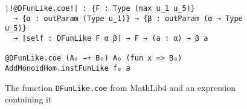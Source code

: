 \begin{figure}
  \begin{CenteredBox}
    \begin{lstlisting}[style=leanHH]
|!@DFunLike.coe!| : {F : Type (max u_1 u_5)}
  → {α : outParam (Type u_1)} → {β : outParam (α → Type u_5)}
  → [self : DFunLike F α β] → F → (a : α) → β a

@DFunLike.coe (A₀ →+ B₀) A₀ (fun x => B₀) AddMonoidHom.instFunLike f₀ a 
    \end{lstlisting}
  \end{CenteredBox}
  \caption{The function \texttt{DFunLike.coe} from MathLib4 and an expression
  containing it}
  \label{dfun}
\end{figure}